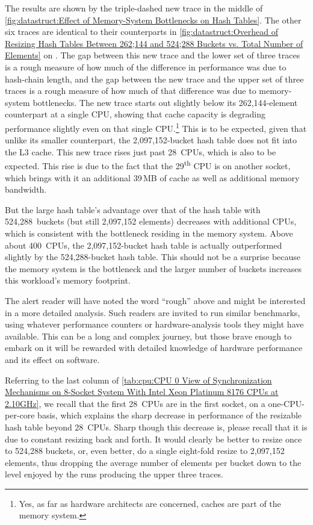 {	The results are shown by the triple-dashed new trace in
	the middle of
	\cref{fig:datastruct:Effect of Memory-System Bottlenecks on Hash Tables}.
	The other six traces are identical to their counterparts in
	\cref{fig:datastruct:Overhead of Resizing Hash Tables Between 262;144 and 524;288 Buckets vs. Total Number of Elements}
	on .
	The gap between this new trace and the lower set of three
	traces is a rough measure of how much of the difference in
	performance was due to hash-chain length, and the gap between
	the new trace and the upper set of three traces is a rough measure
	of how much of that difference was due to memory-system bottlenecks.
	The new trace starts out slightly below its 262,144-element
	counterpart at a single CPU, showing that cache capacity is
	degrading performance slightly even on that single CPU\@.\footnote{
		Yes, as far as hardware architects are concerned,
		caches are part of the memory system.}
	This is to be expected, given that unlike its smaller counterpart,
	the 2,097,152-bucket hash table does not fit into the L3 cache.
	This new trace rises just past 28~CPUs, which is also to be
	expected.
	This rise is due to the fact that the 29\textsuperscript{th}
	CPU is on another socket, which brings with it an additional
	39\,MB of cache as well as additional memory bandwidth.

	But the large hash table's advantage over that of the hash table
	with 524,288~buckets (but still 2,097,152 elements) decreases
	with additional CPUs, which is consistent with the bottleneck
	residing in the memory system.
	Above about 400~CPUs, the 2,097,152-bucket hash table is
	actually outperformed slightly by the 524,288-bucket hash
	table.
	This should not be a surprise because the memory system is
	the bottleneck and the larger number of buckets increases this
	workload's memory footprint.

	The alert reader will have noted the word ``rough'' above
	and might be interested in a more detailed analysis.
	Such readers are invited to run similar benchmarks, using
	whatever performance counters or hardware-analysis tools
	they might have available.
	This can be a long and complex journey, but those brave enough
	to embark on it will be rewarded with detailed knowledge of
	hardware performance and its effect on software.
}\QuickQuizEnd

Referring to the last column of
\cref{tab:cpu:CPU 0 View of Synchronization Mechanisms on 8-Socket System With Intel Xeon Platinum 8176 CPUs at 2.10GHz},
we recall that the first 28~CPUs are in the first socket, on a
one-CPU-per-core basis, which explains the sharp decrease in performance
of the resizable hash table beyond 28~CPUs.
Sharp though this decrease is, please recall that it is due to constant
resizing back and forth.
It would clearly be better to resize once to 524,288 buckets,
or, even better, do a single eight-fold resize to 2,097,152 elements,
thus dropping the average number of elements per bucket down to the
level enjoyed by the runs producing the upper three traces.

